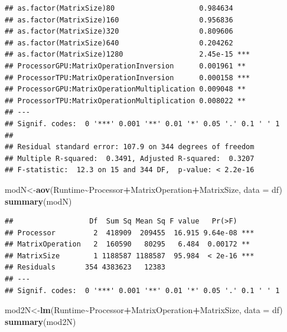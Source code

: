 \documentclass[
]{article}
\newenvironment{Shaded}{\begin{snugshade}}{\end{snugshade}}
\newcommand{\DataTypeTok}[1]{\textcolor[rgb]{0.13,0.29,0.53}{#1}}
\newcommand{\KeywordTok}[1]{\textcolor[rgb]{0.13,0.29,0.53}{\textbf{#1}}}
\newcommand{\NormalTok}[1]{#1}
\newcommand{\OperatorTok}[1]{\textcolor[rgb]{0.81,0.36,0.00}{\textbf{#1}}}
\begin{document}
\begin{verbatim}
## as.factor(MatrixSize)80                    0.984634    
## as.factor(MatrixSize)160                   0.956836    
## as.factor(MatrixSize)320                   0.809606    
## as.factor(MatrixSize)640                   0.204262    
## as.factor(MatrixSize)1280                  2.45e-15 ***
## ProcessorGPU:MatrixOperationInversion      0.001961 ** 
## ProcessorTPU:MatrixOperationInversion      0.000158 ***
## ProcessorGPU:MatrixOperationMultiplication 0.009048 ** 
## ProcessorTPU:MatrixOperationMultiplication 0.008022 ** 
## ---
## Signif. codes:  0 '***' 0.001 '**' 0.01 '*' 0.05 '.' 0.1 ' ' 1
## 
## Residual standard error: 107.9 on 344 degrees of freedom
## Multiple R-squared:  0.3491, Adjusted R-squared:  0.3207 
## F-statistic:  12.3 on 15 and 344 DF,  p-value: < 2.2e-16
\end{verbatim}

\begin{Shaded}
\begin{Highlighting}[]
\NormalTok{modN\textless{}{-}}\KeywordTok{aov}\NormalTok{(Runtime}\OperatorTok{\textasciitilde{}}\NormalTok{Processor}\OperatorTok{+}\NormalTok{MatrixOperation}\OperatorTok{+}\NormalTok{MatrixSize, }\DataTypeTok{data =}\NormalTok{ df)}
\KeywordTok{summary}\NormalTok{(modN)}
\end{Highlighting}
\end{Shaded}

\begin{verbatim}
##                  Df  Sum Sq Mean Sq F value   Pr(>F)    
## Processor         2  418909  209455  16.915 9.64e-08 ***
## MatrixOperation   2  160590   80295   6.484  0.00172 ** 
## MatrixSize        1 1188587 1188587  95.984  < 2e-16 ***
## Residuals       354 4383623   12383                     
## ---
## Signif. codes:  0 '***' 0.001 '**' 0.01 '*' 0.05 '.' 0.1 ' ' 1
\end{verbatim}

\begin{Shaded}
\begin{Highlighting}[]
\NormalTok{mod2N\textless{}{-}}\KeywordTok{lm}\NormalTok{(Runtime}\OperatorTok{\textasciitilde{}}\NormalTok{Processor}\OperatorTok{+}\NormalTok{MatrixOperation}\OperatorTok{+}\NormalTok{MatrixSize, }\DataTypeTok{data =}\NormalTok{ df)}
\KeywordTok{summary}\NormalTok{(mod2N)}
\end{Highlighting}
\end{Shaded}
\end{document}
